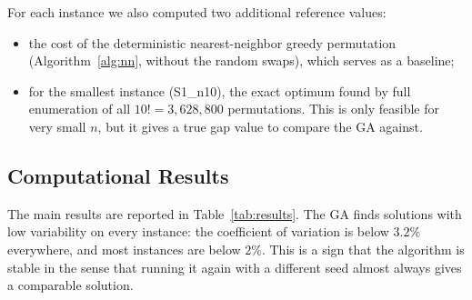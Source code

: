 \documentclass [a4paper, 11pt, titlepage] {article}
\begin{document}
For each instance we also computed two additional reference values:

\begin{itemize}
    \item the cost of the deterministic nearest-neighbor greedy permutation (Algorithm~\ref{alg:nn}, without the random swaps), which serves as a baseline;
    \item for the smallest instance (S1\_n10), the exact optimum found by full enumeration of all $10! = 3{,}628{,}800$ permutations. This is only feasible for very small $n$, but it gives a true gap value to compare the GA against.
\end{itemize}

\subsection{Computational Results}
\label{sec:compres}

The main results are reported in Table~\ref{tab:results}. The GA finds solutions with low variability on every instance: the coefficient of variation is below $3.2\%$ everywhere, and most instances are below $2\%$. This is a sign that the algorithm is stable in the sense that running it again with a different seed almost always gives a comparable solution.
\end{document}
